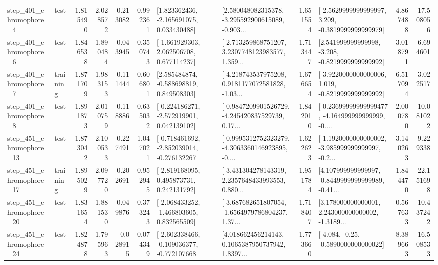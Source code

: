 \begin{tabular}{llrrrrllrlrr}
   step\_401\_chromophore\_4 &      test &      1.815490 &    2.028572 &      0.213082 &  0.992361 &    [1.823362436, -2.165691075, 0.033430488] &  [2.580048082315378, -3.295592900615089, -0.903... &       1.651554 &  [-2.5629999999999997, 3.209, -0.3819999999999979] &            4.867488 &         17.508056 \\
   step\_401\_chromophore\_6 &      test &      1.846538 &    1.890484 &      0.043945 &  0.350743 &    [-1.661929303, 2.062506708, 0.677114237] &  [-2.713259868751207, 3.2307748123983577, 1.359... &       1.713447 &   [2.541999999999998, -3.208, -0.8219999999999992] &            3.018791 &          6.694601 \\
   step\_401\_chromophore\_7 &  training &      1.871709 &    1.983153 &      0.111444 &  0.606801 &    [2.585484874, -0.588698819, 0.849508303] &  [-4.218743537975208, 0.9181177072581828, -1.03... &       1.676654 &  [-3.9220000000000006, 1.019, -0.8219999999999992] &            6.517094 &          3.022517 \\
   step\_401\_chromophore\_8 &      test &      1.891873 &    2.010759 &      0.118886 &  0.635032 &   [-0.224186271, -2.572919901, 0.042139102] &  [-0.9847209901526729, -4.245420837529739, 0.17... &       1.842010 &  [-0.23699999999999477, -4.164999999999999, -0.... &            2.000780 &         10.081022 \\
  step\_451\_chromophore\_13 &      test &      1.873042 &    2.100533 &      0.227491 &  1.047021 &  [-0.718461692, -2.852039014, -0.276132267] &  [-0.9995312752323279, -4.3063360146923895, -0.... &       1.622623 &  [-1.1920000000000002, -3.985999999999997, -0.2... &            3.140263 &          9.229338 \\
  step\_451\_chromophore\_17 &  training &      1.895029 &    2.097720 &      0.202691 &  0.952945 &    [-2.819168095, 0.495873731, 0.242131792] &  [-3.431304278143319, 2.2357648433993553, 0.880... &       1.951784 &  [4.107999999999997, -0.8449999999999989, -0.41... &            1.844470 &         22.151698 \\
  step\_451\_chromophore\_20 &      test &      1.831654 &    1.881530 &      0.049876 &  0.373243 &   [-2.068433252, -1.466803605, 0.832565509] &  [-3.687682651807054, -1.6564979786804237, 1.37... &       1.718407 &  [3.178000000000001, 2.243000000000002, -1.3189... &            0.567633 &         10.437242 \\
  step\_451\_chromophore\_24 &      test &      1.824878 &    1.795963 &     -0.028915 &  0.074349 &  [-2.602338466, -0.109036377, -0.772107668] &  [4.018662456214143, 0.1065387950737942, 1.8397... &       1.773660 &               [-4.084, -0.25, -0.5890000000000022] &            8.389663 &         16.508533 \\

\end{tabular}
